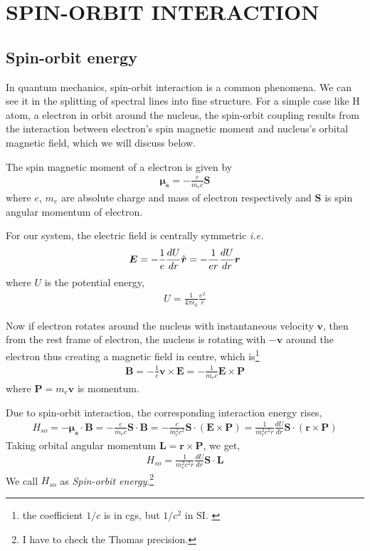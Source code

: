 \documentclass[11pt,a4paper]{article}
\numberwithin{equation}{section}
\begin{document}
\clearpage

\section{SPIN-ORBIT INTERACTION}

\subsection{Spin-orbit energy}
In quantum mechanics, spin-orbit interaction is a common phenomena. We can see it in the splitting of spectral lines into fine structure. For a simple case like H atom, a electron in orbit around the nucleus, the spin-orbit coupling results from the interaction between electron's spin magnetic moment and nucleus's orbital magnetic field, which we will discuss below. \cite{WO}\cite{zettili 09} 

The spin magnetic moment of a electron is given by
\begin{align}
	\boldsymbol{\mu_s}=-\frac{e}{m_ec}\boldsymbol{S}
\end{align}
where $e$, $m_e$ are absolute charge and mass of electron respectively and $\boldsymbol{S}$ is spin angular momentum of electron.

For our system, the electric field is centrally symmetric \textit{i.e.}
\begin{align}
	\boldsymbol{E}= -\frac{1}{e}\frac{dU}{dr}\Hat{\boldsymbol{r}}= -\frac{1}{er}\frac{dU}{dr}\boldsymbol{r}
\end{align} where $U$ is the potential energy, 
\begin{align}
	U = \frac{1}{4\pi\epsilon_0}\frac{e^2}{r}
\end{align}

Now if electron rotates around the nucleus with instantaneous velocity $\boldsymbol{v}$, then from the rest frame of electron, the nucleus is rotating with $-\boldsymbol{v}$ around the electron thus creating a magnetic field in centre, which is\footnote{the coefficient $1/c$ is in cgs, but $1/c^2$ in SI. \cite{relativity -wiki}} 
\begin{align}
	\boldsymbol{B} = -\frac{1}{c} \boldsymbol{v}\times\boldsymbol{E} = -\frac{1}{m_ec}\boldsymbol{E}\times\boldsymbol{P}
\end{align}where $\boldsymbol{P}=m_e\boldsymbol{v}$ is momentum.

Due to spin-orbit interaction, the corresponding interaction energy rises,
\begin{align}
	H_{so}= -\boldsymbol{\mu_s}\cdot \boldsymbol{B} = -\frac{e}{m_ec}\boldsymbol{S}\cdot\boldsymbol{B} =
	-\frac{e}{m_e^2c^2}\boldsymbol{S}\cdot(\boldsymbol{E}\times\boldsymbol{P}) 
	=\frac{1}{m_e^2c^2r}\frac{dU}{dr}\boldsymbol{S}\cdot(\boldsymbol{r}\times\boldsymbol{P})
\end{align} Taking orbital angular momentum $\boldsymbol{L}=\boldsymbol{r}\times\boldsymbol{P}$, we get,
\begin{align}
	H_{so}=\frac{1}{m_e^2c^2r}\frac{dU}{dr}\boldsymbol{S}\cdot\boldsymbol{L}
\end{align}
We call $H_{so}$ as \textit{Spin-orbit energy}.\footnote{I have to check the Thomas precision.}
\end{document}
